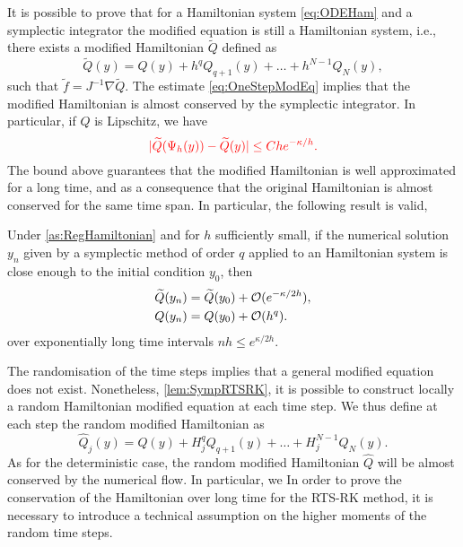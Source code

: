 \documentclass[10pt]{article}
\begin{document}
It is possible to prove  that for a Hamiltonian system \eqref{eq:ODEHam} and a symplectic integrator the modified equation is still a Hamiltonian system, i.e., there exists a modified Hamiltonian $\tilde Q$ defined as
\begin{equation}\label{eq:ModifiedHamiltonianTrunc}
\tilde Q(y) = Q(y) + h^q Q_{q+1}(y) + \ldots + h^{N-1} Q_N(y),
\end{equation}
such that $\tilde f = J^{-1} \nabla \tilde Q$. The estimate \eqref{eq:OneStepModEq} implies that the modified Hamiltonian is almost conserved by the symplectic integrator. In particular, if $Q$ is Lipschitz, we have
\begin{equation}\label{eq:LocalErrorHamiltonianDet}
	{\color{red}\lvert\widetilde Q(\Psi_h(y)) - \widetilde Q(y)\rvert \leq Che^{-\kappa/h}.}
\end{equation}
The bound above guarantees that the modified Hamiltonian is well approximated for a long time, and as a consequence that the original Hamiltonian is almost conserved for the same time span. In particular, the following result is valid, 
\begin{theorem}\label{thm:DetHamiltonian} Under \cref{as:RegHamiltonian} and for $h$ sufficiently small, if the numerical solution $y_n$ given by a symplectic method of order $q$ applied to an Hamiltonian system is close enough to the initial condition $y_0$, then 
	\begin{equation}
	\begin{aligned}
	\widetilde Q(y_n) &= \widetilde Q(y_0) + \mathcal{O}(e^{-\kappa / 2h}), \\
	Q(y_n) &= Q(y_0) + \mathcal{O}(h^q).
	\end{aligned}
	\end{equation}
	over exponentially long time intervals $nh \leq e^{\kappa / 2h}$.
\end{theorem}
The randomisation of the time steps implies that a general modified equation does not exist. Nonetheless,  \cref{lem:SympRTSRK}, it is possible to construct locally a random Hamiltonian modified equation at each time step. We thus define at each step the random modified Hamiltonian as
\begin{equation}
\hat Q_j(y) = Q(y) + H_j^q Q_{q+1}(y) + \ldots + H_j^{N-1} Q_N(y).
\end{equation}
As for the deterministic case, the random modified Hamiltonian $\hat Q$ will be almost conserved by the numerical flow. In particular, we  In order to prove the conservation of the Hamiltonian over long time for the RTS-RK method, it is necessary to introduce a technical assumption on the higher moments of the random time steps.
\end{document}
